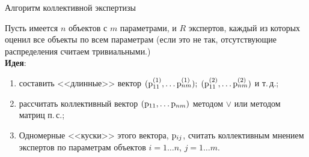 \begin{frame}{Алгоритм коллективной экспертизы}
 \begin{center}
    Пусть имеется $n$ объектов с $m$ параметрами, и $R$ экспертов, каждый из которых оценил все объекты по всем параметрам (если это не так, отсутствующие распределения считаем тривиальными.)
	\\ \vspace{3mm} \textbf{Идея}: 
	\begin{enumerate}
		\item составить <<длинные>> вектор $({\mathrm{p}}_{11}^{(1)}, \ldots {\mathrm{p}}_{nm}^{(1)});\; ({\mathrm{p}}_{11}^{(2)}, \ldots {\mathrm{p}}_{nm}^{(2)})$ и т.\,д.;
		\item рассчитать коллективный вектор $({\mathrm{p}}_{11}, \ldots {\mathrm{p}}_{nm})$ методом $\vee$ или методом матриц п.\,с.;
		\item Одномерные <<куски>> этого вектора, ${\mathrm{p}}_{ij}$,  считать коллективным мнением экспертов по параметрам объектов {\footnotesize $i = 1 \ldots n$, $j = 1 \ldots m$}. 
	\end{enumerate}	
 \end{center}
\end{frame}